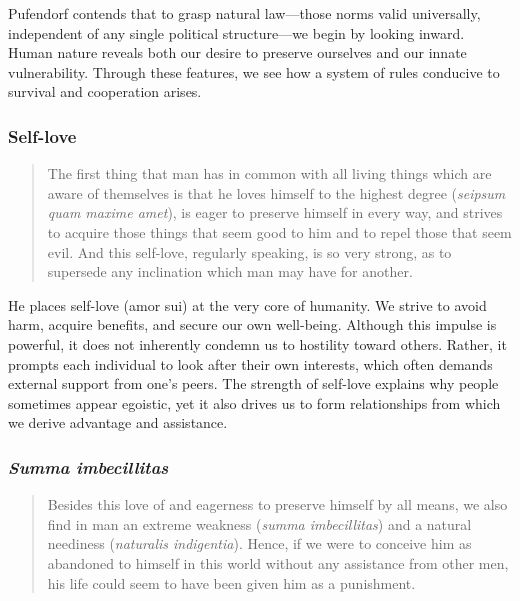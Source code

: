             Pufendorf contends that to grasp natural law—those norms valid universally, independent of any single political structure—we begin by looking inward. Human nature reveals both our desire to preserve ourselves and our innate vulnerability. Through these features, we see how a system of rules conducive to survival and cooperation arises.

        \subsubsection{Self-love}

            \begin{quote}
                The first thing that man has in common with all living things which are aware of themselves is that he loves himself to the highest degree (\textit{seipsum quam maxime amet}), is eager to preserve himself in every way, and strives to acquire those things that seem good to him and to repel those that seem evil. And this self-love, regularly speaking, is so very strong, as to supersede any inclination which man may have for another.
            \end{quote}

            He places self-love (amor sui) at the very core of humanity. We strive to avoid harm, acquire benefits, and secure our own well-being. Although this impulse is powerful, it does not inherently condemn us to hostility toward others. Rather, it prompts each individual to look after their own interests, which often demands external support from one’s peers. The strength of self-love explains why people sometimes appear egoistic, yet it also drives us to form relationships from which we derive advantage and assistance.

        \subsubsection{\textit{Summa imbecillitas}}
        
            \begin{quote}
                Besides this love of and eagerness to preserve himself by all means, we also find in man an extreme weakness (\textit{summa imbecillitas}) and a natural neediness (\textit{naturalis indigentia}). Hence, if we were to conceive him as abandoned to himself in this world without any assistance from other men, his life could seem to have been given him as a punishment.
            \end{quote}

